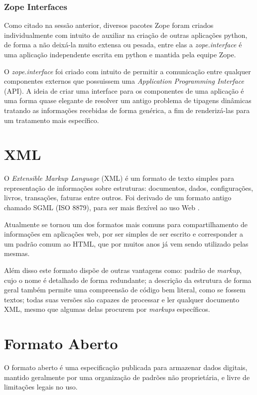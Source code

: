 \subsubsection{Zope Interfaces}

Como citado na sessão anterior, diversos pacotes Zope foram criados individualmente com intuito de auxiliar na criação de outras aplicações python, de forma a não deixá-la muito extensa ou pesada, entre elas a \textit{zope.interface} é uma aplicação independente escrita em python e mantida pela equipe Zope.

O \textit{zope.interface} foi criado com intuito de permitir a comunicação entre qualquer componentes externos que possuissem uma \textit{Application Programming Interface} (API). A ideia de criar uma interface para os componentes de uma aplicação é uma forma quase elegante de resolver um antigo problema de tipagens dinâmicas tratando as informações recebidas de forma genérica, a fim de renderizá-las para um tratamento mais específico.

\section{XML}

O \textit{Extensible Markup Language} (XML) é um formato de texto simples para representação de informações sobre estruturas: documentos, dados, configurações, livros, transações, faturas entre outros. Foi derivado de um formato antigo chamado SGML (ISO 8879), para ser mais flexível ao uso Web \cite{W3C-XML}.

Atualmente se tornou um dos formatos mais comuns para compartilhamento de informações em aplicações web, por ser simples de ser escrito e corresponder a um padrão comum ao HTML, que por muitos anos já vem sendo utilizado pelas mesmas.

Além disso este formato dispõe de outras vantagens como: padrão de \textit{markup}, cujo o nome é detalhado de forma redundante; a descrição da estrutura de forma geral também permite uma compreensão de código bem literal, como se fossem textos; todas suas versões são capazes de processar e ler qualquer documento XML, mesmo que algumas delas procurem por \textit{markups} específicos.

\section{Formato Aberto}

O formato aberto é uma especificação publicada para armazenar dados digitais, mantido geralmente por uma organização de padrões não proprietária, e livre de limitações legais no uso.

